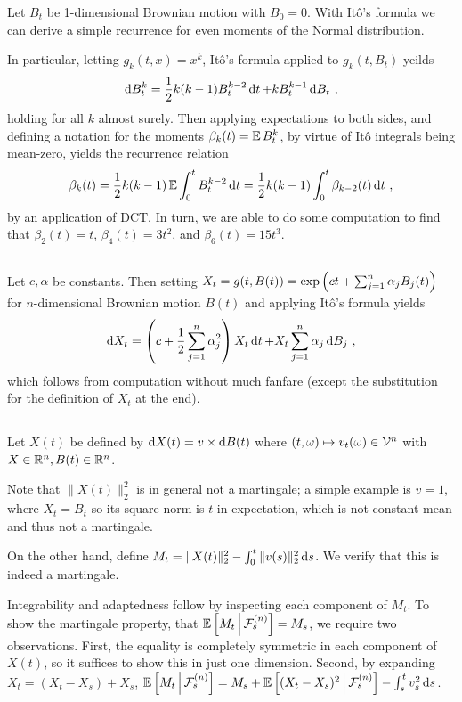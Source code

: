 \documentclass{article}
\begin{document}
Let \(B_t\) be 1-dimensional Brownian motion with \(B_0=0\). With It\^{o}'s formula we can derive a simple recurrence for even moments of the Normal distribution.

In particular, letting \(g_k(t, x)=x^k\), It\^{o}'s formula applied to \(g_k(t, B_t)\) yeilds
\[
  \mathop{\mathrm{d} B_t^k }=\frac{1}{2}k(k-1)B_t^{k-2}\mathop{\mathrm{d} t }+kB_t^{k-1}\mathop{\mathrm{d} B_t }\,\,,
\]
holding for all \(k\) almost surely. Then applying expectations to both sides, and defining a notation for the moments \(\beta_k(t)=\operatorname{\mathbb{E}} B_t^k\), by virtue of It\^{o} integrals being mean-zero, yields the recurrence relation
\[
  \beta_k(t)=\frac{1}{2}k(k-1)\operatorname{\mathbb{E}} \int_0^tB_t^{k-2}\mathop{\mathrm{d} t }=\frac{1}{2}k(k-1)\int_0^t\beta_{k-2}(t)\mathop{\mathrm{d} t }\,\,,
\]
by an application of DCT. In turn, we are able to do some computation to find that \(\beta_2(t)=t\), \(\beta_4(t)=3t^2\), and \(\beta_6(t)=15t^3\).

\subsection{} %

Let \(c,\alpha\) be constants. Then setting \(X_t=g(t, B(t))=\exp\left({ct+\sum_{j=1}^n\alpha_jB_j(t)}\right)\) for \(n\)-dimensional Brownian motion \(B(t)\) and applying It\^{o}'s formula yields
\[
  \mathop{\mathrm{d} X_t }=\left({c+\frac{1}{2}\sum_{j=1}^n\alpha_j^2}\right)X_t\mathop{\mathrm{d} t }+X_t\sum_{j=1}^{n}\alpha_j\mathop{\mathrm{d} B_j }\,\,,
\]
which follows from computation without much fanfare (except the substitution for the definition of \(X_t\) at the end).

\subsection{} %

Let \(X(t)\) be defined by \(\mathop{\mathrm{d} X(t) }=v\times \mathop{\mathrm{d} B(t) }\) where \((t,\omega)\mapsto v_t(\omega)\in\mathcal{V}^n\) with \(X\in\mathbb{R}^n,B(t)\in\mathbb{R}^n\).

Note that \(\|X(t)\|_2^2\) is in general not a martingale; a simple example is \(v=1\), where \(X_t=B_t\) so its square norm is \(t\) in expectation, which is not constant-mean and thus not a martingale.

On the other hand, define \(M_t=\|X(t)\|_2^2-\int_0^t\|v(s)\|_2^2\mathop{\mathrm{d} s }\). We verify that this is indeed a martingale.

Integrability and adaptedness follow by inspecting each component of \(M_t\). To show the martingale property, that \(\operatorname{\mathbb{E}}\left[ M_t \,\middle|\, \mathcal{F}_s^{(n)} \right]=M_s\), we require two observations. First, the equality is completely symmetric in each component of \(X(t)\), so it suffices to show this in just one dimension. Second, by expanding \(X_t=(X_t-X_s)+X_s\), \(\operatorname{\mathbb{E}}\left[ M_t \,\middle|\, \mathcal{F}_s^{(n)} \right]=M_s+\operatorname{\mathbb{E}}\left[ (X_t-X_s)^2 \,\middle|\, \mathcal{F}_s^{(n)} \right]-\int_s^tv_s^2\mathop{\mathrm{d} s }\).
\end{document}
